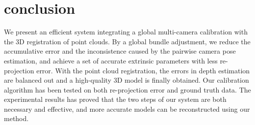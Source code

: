 \section{conclusion}
We present an efficient system integrating a global multi-camera calibration with the 3D registration of point clouds.
By a global bundle adjustment, we reduce the accumulative error and the inconsistence caused by the pairwise camera pose estimation, and achieve a set of accurate extrinsic parameters with less re-projection error.
With the point cloud registration, the errors in depth estimation are balanced out and a high-quality 3D model is finally obtained.
Our calibration algorithm has been tested on both re-projection error and ground truth data. The experimental results has proved that the two steps of our system are both necessary and effective, and more accurate models can be reconstructed using our method.



